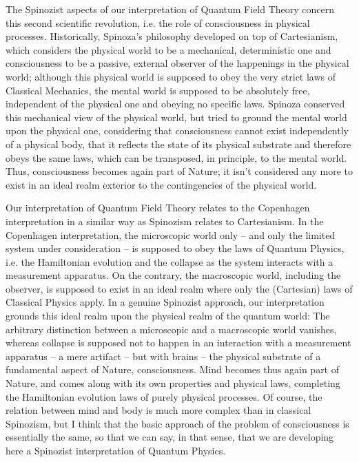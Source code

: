 \documentclass[10pt,a4paper,twoside,openany]{book}
\begin{document}
The Spinozist aspects of our interpretation of Quantum Field Theory concern this second scientific revolution, i.e. the role of consciousness in physical processes. Historically, Spinoza's philosophy developed on top of Cartesianism, which considers the physical world to be a mechanical, deterministic one and consciousness to be a passive, external observer of the happenings in the physical world; although this physical world is supposed to obey the very strict laws of Classical Mechanics, the mental world is supposed to be absolutely free, independent of the physical one and obeying no specific laws. Spinoza conserved this mechanical view of the physical world, but tried to ground the mental world upon the physical one, considering that consciousness cannot exist independently of a physical body, that it reflects the state of its physical substrate and therefore obeys the same laws, which can be transposed, in principle, to the mental world. Thus, consciousness becomes again part of Nature; it isn't considered any more to exist in an ideal realm exterior to the contingencies of the physical world.

Our interpretation of Quantum Field Theory relates to the Copenhagen interpretation in a similar way as Spinozism relates to Cartesianism. In the Copenhagen interpretation, the microscopic world only -- and only the limited system under consideration -- is supposed to obey the laws of Quantum Physics, i.e. the Hamiltonian evolution and the collapse as the system interacts with a measurement apparatus. On the contrary, the macroscopic world, including the observer, is supposed to exist in an ideal realm where only the (Cartesian) laws of Classical Physics apply. In a genuine Spinozist approach, our interpretation grounds this ideal realm upon the physical realm of the quantum world: The arbitrary distinction between a microscopic and a macroscopic world vanishes, whereas collapse is supposed not to happen in an interaction with a measurement apparatus -- a mere artifact -- but with brains -- the physical substrate of a fundamental aspect of Nature, consciousness. Mind becomes thus again part of Nature, and comes along with its own properties and physical laws, completing the Hamiltonian evolution laws of purely physical processes. Of course, the relation between mind and body is much more complex than in classical Spinozism, but I think that the basic approach of the problem of consciousness is essentially the same, so that we can say, in that sense, that we are developing here a Spinozist interpretation of Quantum Physics.
\end{document}

